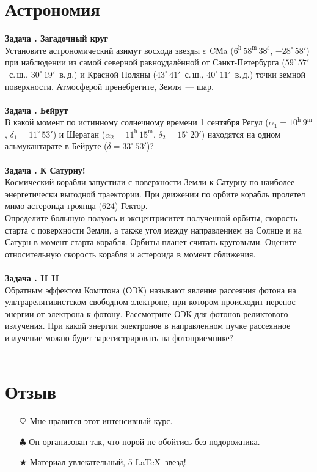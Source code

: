 \documentclass[11pt]{article}
\newcounter{astron}[section]
\newcommand{\heart}{\ensuremath\heartsuit}
\newenvironment{astro}[1]{\textbf{\stepcounter{astron}Задача \theastron. #1 \vspace{5pt}\\}}{\\\\}
\begin{document}
    \section{Астрономия}
    \begin{astro}{Загадочный круг}
        Установите астрономический азимут восхода звезды $\varepsilon$ CМa ($6^\text{h}\,58^\text{m}\,38^\text{s}$, $-28^\circ\,58'$) при наблюдении из самой северной равноудалённой от Санкт-Петербурга ($59^\circ\,57'$~с.\,ш., $30^\circ\,19'$~в.\,д.) и Красной Поляны ($43^\circ\,41'$~с.\,ш., $40^\circ\,11'$~в.\,д.) точки земной поверхности. Атмосферой пренебрегите, Земля~--- шар.
    \end{astro}
    \begin{astro}{Бейрут}
        В какой момент по истинному солнечному времени 1 сентября Регул ($\alpha_1 = 10^\text{h}\,9^\text{m}$, $\delta_1 = 11^\circ\,53'$) и Шератан ($\alpha_2 = 11^\text{h}\,15^\text{m}$, $\delta_2 = 15^\circ\,20'$) находятся на одном альмукантарате в Бейруте ($\delta = 33^\circ\,53'$)?
    \end{astro}
    \begin{astro}{К Сатурну!}
        Космический корабли запустили с поверхности Земли к Сатурну по наиболее энергетически выгодной траектории. При движении по орбите корабль пролетел мимо астероида-троянца (624) Гектор.\\
        Определите большую полуось и эксцентриситет полученной орбиты, скорость старта с поверхности Земли, а также угол между направлением на Солнце и на Сатурн в момент старта корабля. Орбиты планет считать круговыми. Оцените относительную скорость корабля и астероида в момент сближения.
    \end{astro}
    \begin{astro}{H II}
        Обратным эффектом Комптона (ОЭК) называют явление рассеяния фотона на ультрарелятивистском свободном электроне, при котором происходит перенос энергии от электрона к фотону.  Рассмотрите ОЭК для фотонов реликтового излучения. При какой энергии электронов в направленном пучке рассеянное излучение можно будет зарегистрировать на фотоприемнике?
    \end{astro}

    \section{Отзыв}
    \begin{itemize}
        \item[$\heart$] Мне нравится этот интенсивный курс.
        \item[$\clubsuit$] Он организован так, что порой не обойтись без подорожника.
        \item[$\bigstar$] Материал увлекательный, 5 \LaTeX~звезд!
    \end{itemize}
\end{document}
